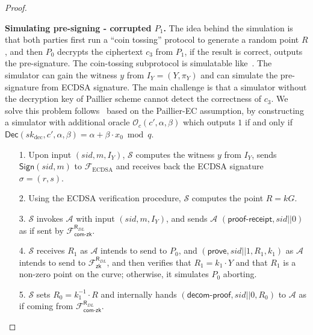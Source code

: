 \documentclass{llncs}
\begin{document}
\begin{proof}
\begin{trivlist}
\item \textbf{Simulating pre-signing - corrupted $P_1$.} The idea behind the simulation is that both parties first run a ``coin tossing'' protocol to generate a random point $R$, and then $P_0$ decrypts the ciphertext $c_3$ from $P_1$, if the result is correct, outputs the pre-signature. The coin-tossing subprotocol is simulatable like~\cite{Lin17}. The simulator can gain the witness $y$ from $I_Y=(Y,\pi_Y)$ and can simulate the pre-signature from ECDSA signature. The main challenge is that a simulator without the decryption key of Paillier scheme cannot detect the correctness of $c_3$. We solve this problem follows~\cite{Lin17} based on the Paillier-EC assumption, by constructing a simulator with additional oracle $\mathcal{O}_c(c',\alpha,\beta)$ which outputs $1$ if and only if $\mathsf{Dec}(sk_{\text{dec}},c',\alpha,\beta)=\alpha+\beta \cdot x_0 \bmod q$. 

\begin{itemize}
\item[1.] Upon input $(sid,m,I_Y)$, $\mathcal{S}$ computes the witness $y$ from $I_Y$, sends $\mathsf{Sign}(sid,m)$ to $\mathcal{F}_{\text{ECDSA}}$ and receives back the ECDSA signature $\sigma=(r, s)$. 

\item[2.] Using the ECDSA verification procedure, $\mathcal{S}$ computes the point $R=kG$.

\item[3.] $\mathcal{S}$ invokes $\mathcal{A}$ with input $(sid,m,I_Y)$, and sends $\mathcal{A}$ 
$(\mathsf{proof\text{-}receipt}, sid||0)$ as if sent by $\mathcal{F}^{\mathsf{R}_{DL}}_{\mathsf{com\text{-}zk}}$.
 
\item[4.] $\mathcal{S}$ receives $R_1$ as $\mathcal{A}$ intends to send to $P_0$, and $(\mathsf{prove},sid||1,R_1,k_1)$ as $\mathcal{A}$ intends to send to $\mathcal{F}^{\mathsf{R}_{DL}}_{\mathsf{zk}}$, and then verifies that $R_1 = k_1 \cdot Y$ and that $R_1$ is a non-zero point on the curve; otherwise, it simulates $P_0$ aborting.

\item[5.] $\mathcal{S}$ sets $R_0= k_1^{-1}\cdot R$ and internally hands $(\mathsf{decom\text{-}proof}, sid||0, R_0)$ to $\mathcal{A}$ as if coming from $\mathcal{F}^{\mathsf{R}_{DL}}_{\mathsf{com\text{-}zk}}$.


\end{itemize}
\end{trivlist}
\end{proof}
\end{document}
